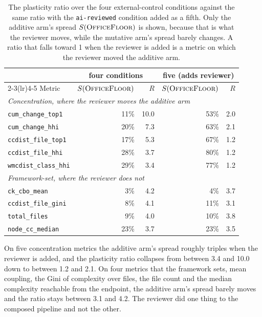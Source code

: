 \documentclass[11pt,a4paper]{article}
\newcommand{\offl}{\textsc{OfficeFloor}}
\begin{document}
\begin{table}[t]
\centering
\caption{The plasticity ratio over the four external-control conditions against
the same ratio with the \texttt{ai-reviewed} condition added as a fifth. Only the
additive arm's spread $S(\offl{})$ is shown, because that is what the reviewer
moves, while the mutative arm's spread barely changes. A ratio that falls toward 1 when
the reviewer is added is a metric on which the reviewer moved the additive arm.}
\label{tab:aireview}
\small
\begin{tabular}{lrrrr}
\toprule
 & \multicolumn{2}{c}{four conditions} & \multicolumn{2}{c}{five (adds reviewer)} \\
\cmidrule(lr){2-3}\cmidrule(lr){4-5}
Metric & $S(\offl{})$ & $R$ & $S(\offl{})$ & $R$ \\
\midrule
\multicolumn{5}{l}{\emph{Concentration, where the reviewer moves the additive arm}}\\
\texttt{cum\_change\_top1} & 11\% & 10.0 & 53\% & 2.0 \\
\texttt{cum\_change\_hhi} & 20\% & 7.3 & 63\% & 2.1 \\
\texttt{ccdist\_file\_top1} & 17\% & 5.3 & 67\% & 1.2 \\
\texttt{ccdist\_file\_hhi} & 28\% & 3.7 & 80\% & 1.2 \\
\texttt{wmcdist\_class\_hhi} & 29\% & 3.4 & 77\% & 1.2 \\
\midrule
\multicolumn{5}{l}{\emph{Framework-set, where the reviewer does not}}\\
\texttt{ck\_cbo\_mean} & 3\% & 4.2 & 4\% & 3.7 \\
\texttt{ccdist\_file\_gini} & 8\% & 4.1 & 11\% & 3.1 \\
\texttt{total\_files} & 9\% & 4.0 & 10\% & 3.8 \\
\texttt{node\_cc\_median} & 23\% & 3.7 & 23\% & 3.5 \\
\bottomrule
\end{tabular}
\end{table}

On five concentration metrics the additive arm's spread roughly triples when the
reviewer is added, and the plasticity ratio collapses from between 3.4 and 10.0
down to between 1.2 and 2.1. On four metrics that the framework sets, mean
coupling, the Gini of complexity over files, the file count and the median
complexity reachable from the endpoint, the additive arm's spread barely moves
and the ratio stays between 3.1 and 4.2. The reviewer did one thing to the
composed pipeline and not the other.
\end{document}
